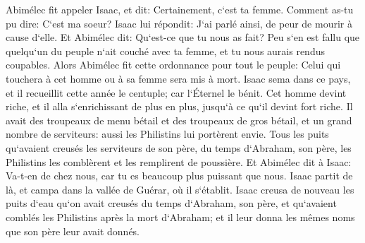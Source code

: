\verse Abimélec fit appeler Isaac, et dit: Certainement, c`est ta femme. Comment as-tu pu dire: C`est ma soeur? Isaac lui répondit: J`ai parlé ainsi, de peur de mourir à cause d`elle. 
\verse Et Abimélec dit: Qu`est-ce que tu nous as fait? Peu s`en est fallu que quelqu`un du peuple n`ait couché avec ta femme, et tu nous aurais rendus coupables. 
\verse Alors Abimélec fit cette ordonnance pour tout le peuple: Celui qui touchera à cet homme ou à sa femme sera mis à mort. 
\verse Isaac sema dans ce pays, et il recueillit cette année le centuple; car l`Éternel le bénit. 
\verse Cet homme devint riche, et il alla s`enrichissant de plus en plus, jusqu`à ce qu`il devint fort riche. 
\verse Il avait des troupeaux de menu bétail et des troupeaux de gros bétail, et un grand nombre de serviteurs: aussi les Philistins lui portèrent envie. 
\verse Tous les puits qu`avaient creusés les serviteurs de son père, du temps d`Abraham, son père, les Philistins les comblèrent et les remplirent de poussière. 
\verse Et Abimélec dit à Isaac: Va-t-en de chez nous, car tu es beaucoup plus puissant que nous. 
\verse Isaac partit de là, et campa dans la vallée de Guérar, où il s`établit. 
\verse Isaac creusa de nouveau les puits d`eau qu`on avait creusés du temps d`Abraham, son père, et qu`avaient comblés les Philistins après la mort d`Abraham; et il leur donna les mêmes noms que son père leur avait donnés. 
